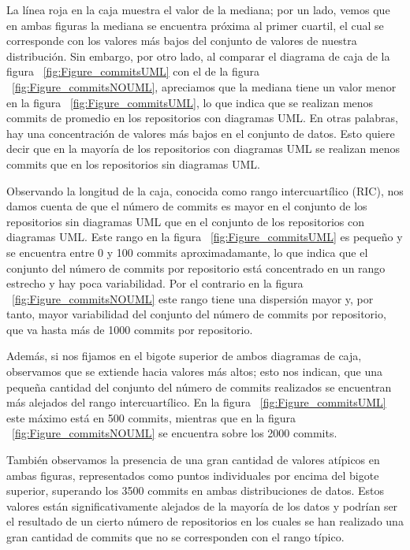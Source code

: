 \documentclass[a4paper, 12pt]{book}
\begin{document}
La línea roja en la caja muestra el valor de la mediana; por un lado, vemos que en ambas figuras la mediana se encuentra próxima al primer cuartil, el cual se corresponde con los valores más bajos del conjunto de valores de nuestra distribución. 
Sin embargo, por otro lado, al comparar el diagrama de caja de la figura ~\ref{fig:Figure_commitsUML} con el de la figura ~\ref{fig:Figure_commitsNOUML}, apreciamos que la mediana tiene un valor menor en la figura ~\ref{fig:Figure_commitsUML}, lo que indica que se realizan menos commits de promedio en los repositorios con diagramas UML. 
En otras palabras, hay una concentración de valores más bajos en el conjunto de datos. 
Esto quiere decir que en la mayoría de los repositorios con diagramas UML se realizan menos commits que en los repositorios sin diagramas UML.

 
Observando la longitud de la caja, conocida como rango intercuartílico (RIC), nos damos cuenta de que el número de commits es mayor en el conjunto de los repositorios sin diagramas UML que en el conjunto de los repositorios con diagramas UML.
Este rango en la figura ~\ref{fig:Figure_commitsUML} es pequeño y se encuentra entre 0 y 100 commits aproximadamante, lo que indica que el conjunto del número de commits por repositorio está concentrado en un rango estrecho y hay poca variabilidad.
Por el contrario en la figura ~\ref{fig:Figure_commitsNOUML} este rango tiene una dispersión mayor y, por tanto, mayor variabilidad del conjunto del número de commits por repositorio, que va hasta más de 1000 commits por repositorio.


Además, si nos fijamos en el bigote superior de ambos diagramas de caja, observamos que se extiende hacia valores más altos; esto nos indican, que una pequeña cantidad del conjunto del número de commits realizados se encuentran más alejados del rango intercuartílico.
En la figura ~\ref{fig:Figure_commitsUML} este máximo está en 500 commits, mientras que en la figura ~\ref{fig:Figure_commitsNOUML} se encuentra sobre los 2000 commits.


También observamos la presencia de una gran cantidad de valores atípicos en ambas figuras, representados como puntos individuales por encima del bigote superior, superando los 3500 commits en ambas distribuciones de datos. 
Estos valores están significativamente alejados de la mayoría de los datos y podrían ser el resultado de un cierto número de repositorios en los cuales se han realizado una gran cantidad de commits que no se corresponden con el rango típico. 
\end{document}
